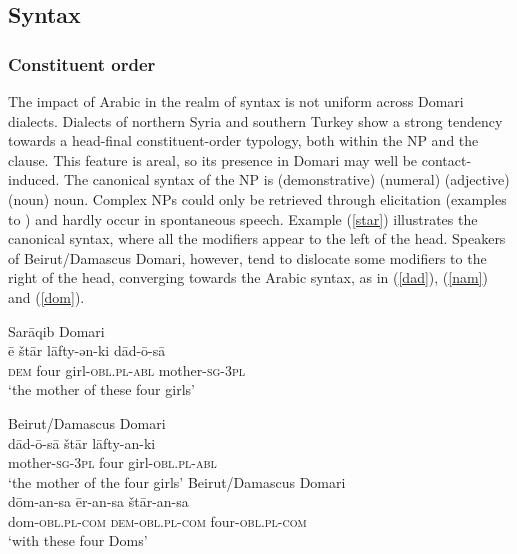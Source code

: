 \documentclass[output=paper]{langsci/langscibook}
\begin{document}
 
 \subsection{Syntax}
 \subsubsection{Constituent order}

The impact of Arabic in the realm of syntax is not uniform across Domari dialects. Dialects of northern Syria and southern Turkey show a strong tendency towards a head-final constituent-order typology, both within the NP and the clause. This feature is areal, so its presence in Domari may well be contact-induced. The canonical syntax of the NP is (demonstrative) (numeral) (adjective) (noun) noun. Complex NPs could only be retrieved through elicitation (examples  to ) and hardly occur in spontaneous speech. Example (\ref{star}) illustrates the canonical syntax, where all the modifiers appear to the left of the head. Speakers of Beirut/Damascus Domari, however, tend to dislocate some modifiers to the right of the head, converging towards the Arabic syntax, as in (\ref{dad}), (\ref{nam}) and (\ref{dom}).

\ea
{Sarāqib Domari}\\ \label{star}
\gll ē štār lāfty-ən-ki dād-ō-sā\\
     \textsc{dem} four girl-\textsc{obl.pl-abl} mother-\textsc{sg-3pl}\\
\glt ‘the mother of these four girls’
\z

\ea \label{dad}
{Beirut/Damascus Domari}\\
\gll dād-ō-sā štār lāfty-an-ki\\
     mother-\textsc{sg-3pl} four girl-\textsc{obl.pl-abl}\\
\glt ‘the mother of the four girls’
\z
{}
\ea \label{dom}
{Beirut/Damascus Domari}\\
\gll dōm-an-sa ēr-an-sa štār-an-sa\\
     dom-\textsc{obl.pl-com} \textsc{dem-obl.pl-com} four-\textsc{obl.pl-com}\\
\glt ‘with these four Doms’
\z
\end{document}
